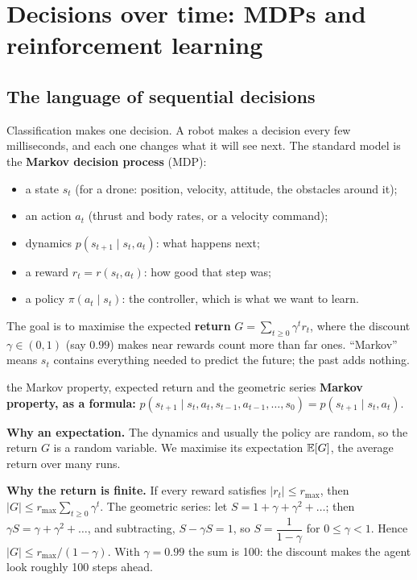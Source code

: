 \section{Decisions over time: MDPs and reinforcement learning}
\label{sec:rl}

\subsection{The language of sequential decisions}
Classification makes one decision. A robot makes a decision every few milliseconds, and each one changes what it will see next. The standard model is the \textbf{Markov decision process} (MDP):
\begin{itemize}
\item a state $s_t$ (for a drone: position, velocity, attitude, the obstacles around it);
\item an action $a_t$ (thrust and body rates, or a velocity command);
\item dynamics $p(s_{t+1}\mid s_t,a_t)$: what happens next;
\item a reward $r_t=r(s_t,a_t)$: how good that step was;
\item a policy $\pi(a_t\mid s_t)$: the controller, which is what we want to learn.
\end{itemize}
The goal is to maximise the expected \textbf{return} $G=\sum_{t\ge0}\gamma^t r_t$, where the discount $\gamma\in(0,1)$ (say $0.99$) makes near rewards count more than far ones. ``Markov'' means $s_t$ contains everything needed to predict the future; the past adds nothing.

\begin{probbox}{the Markov property, expected return and the geometric series}
\textbf{Markov property, as a formula:} $p(s_{t+1}\mid s_t,a_t,s_{t-1},a_{t-1},\dots,s_0)=p(s_{t+1}\mid s_t,a_t)$.

\textbf{Why an expectation.} The dynamics and usually the policy are random, so the return $G$ is a random variable. We maximise its expectation $\mathbb{E}[G]$, the average return over many runs.

\textbf{Why the return is finite.} If every reward satisfies $|r_t|\le r_{\max}$, then $|G|\le r_{\max}\sum_{t\ge0}\gamma^t$. The geometric series: let $S=1+\gamma+\gamma^2+\dots$; then $\gamma S=\gamma+\gamma^2+\dots$, and subtracting, $S-\gamma S=1$, so $S=\dfrac{1}{1-\gamma}$ for $0\le\gamma<1$. Hence $|G|\le r_{\max}/(1-\gamma)$. With $\gamma=0.99$ the sum is 100: the discount makes the agent look roughly 100 steps ahead.
\end{probbox}

